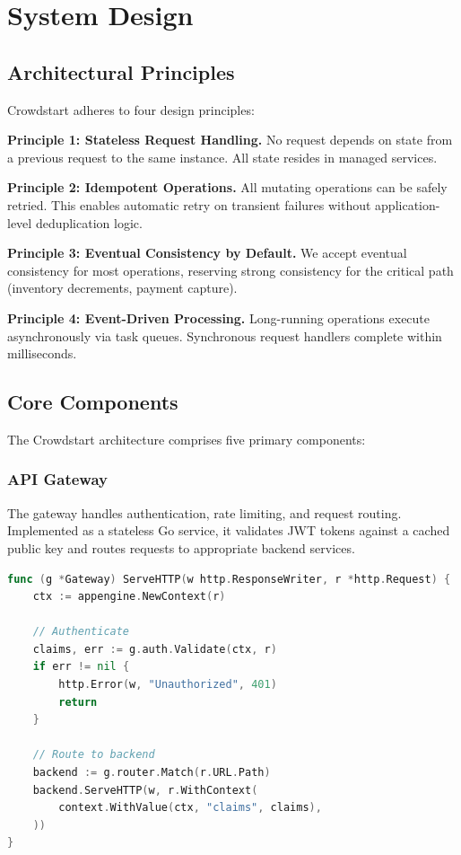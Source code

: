 \section{System Design}


\subsection{Architectural Principles}

Crowdstart adheres to four design principles:

\textbf{Principle 1: Stateless Request Handling.} No request depends on state from a previous request to the same instance. All state resides in managed services.

\textbf{Principle 2: Idempotent Operations.} All mutating operations can be safely retried. This enables automatic retry on transient failures without application-level deduplication logic.

\textbf{Principle 3: Eventual Consistency by Default.} We accept eventual consistency for most operations, reserving strong consistency for the critical path (inventory decrements, payment capture).

\textbf{Principle 4: Event-Driven Processing.} Long-running operations execute asynchronously via task queues. Synchronous request handlers complete within milliseconds.

\subsection{Core Components}

The Crowdstart architecture comprises five primary components:

\subsubsection{API Gateway}

The gateway handles authentication, rate limiting, and request routing. Implemented as a stateless Go service, it validates JWT tokens against a cached public key and routes requests to appropriate backend services.

\begin{lstlisting}[language=Go,caption=Request routing]
func (g *Gateway) ServeHTTP(w http.ResponseWriter, r *http.Request) {
    ctx := appengine.NewContext(r)

    // Authenticate
    claims, err := g.auth.Validate(ctx, r)
    if err != nil {
        http.Error(w, "Unauthorized", 401)
        return
    }

    // Route to backend
    backend := g.router.Match(r.URL.Path)
    backend.ServeHTTP(w, r.WithContext(
        context.WithValue(ctx, "claims", claims),
    ))
}
\end{lstlisting}

